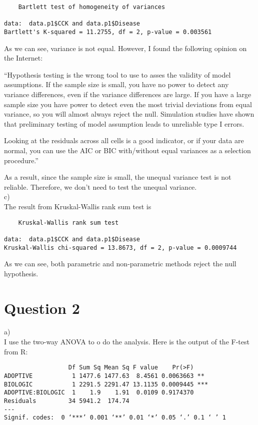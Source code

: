 \documentclass[12pt]{article}
\begin{document}
\begin{verbatim}
	Bartlett test of homogeneity of variances

data:  data.p1$CCK and data.p1$Disease 
Bartlett's K-squared = 11.2755, df = 2, p-value = 0.003561
\end{verbatim}

As we can see, variance is not equal. However, I found the following
opinion on the Internet:

``Hypothesis testing is the wrong tool to use to asses the validity of
model assumptions. If the sample size is small, you have no power to
detect any variance differences, even if the variance differences are
large. If you have a large sample size you have power to detect even
the most trivial deviations from equal variance, so you will almost
always reject the null. Simulation studies have shown that preliminary
testing of model assumption leads to unreliable type I errors.

Looking at the residuals across all cells is a good indicator, or if
your data are normal, you can use the AIC or BIC with/without equal
variances as a selection procedure.''

As a result, since the sample size is small, the unequal variance test
is not reliable. Therefore, we don't need to test the unequal
variance. \\

c) \\

The result from Kruskal-Wallis rank sum test is 

\begin{verbatim}
	Kruskal-Wallis rank sum test

data:  data.p1$CCK and data.p1$Disease 
Kruskal-Wallis chi-squared = 13.8673, df = 2, p-value = 0.0009744
\end{verbatim}

As we can see, both parametric and non-parametric methods reject the
null hypothesis.

\section*{Question 2}

a) \\

I use the two-way ANOVA to o do the analysis. Here is the output of
the F-test from R:

\begin{verbatim}
                  Df Sum Sq Mean Sq F value    Pr(>F)    
ADOPTIVE           1 1477.6 1477.63  8.4561 0.0063663 ** 
BIOLOGIC           1 2291.5 2291.47 13.1135 0.0009445 ***
ADOPTIVE:BIOLOGIC  1    1.9    1.91  0.0109 0.9174370    
Residuals         34 5941.2  174.74                      
---
Signif. codes:  0 ‘***’ 0.001 ‘**’ 0.01 ‘*’ 0.05 ‘.’ 0.1 ‘ ’ 1 
\end{verbatim}
\end{document}
